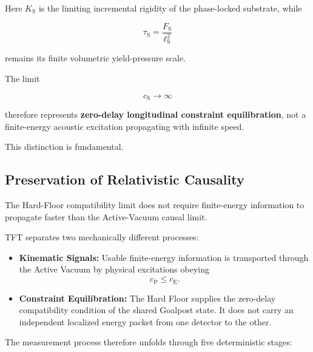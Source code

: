 Here $K_{\mathrm S}$ is the limiting incremental rigidity of the phase-locked substrate, while

\begin{equation}
    \tau_{\mathrm S}
    =
    \frac{F_{\mathrm S}}{\ell_{\mathrm S}^2}
\end{equation}

remains its finite volumetric yield-pressure scale.

The limit

\begin{equation}
    c_{\mathrm S}\longrightarrow\infty
\end{equation}

therefore represents \textbf{zero-delay longitudinal constraint equilibration}, not a finite-energy acoustic excitation propagating with infinite speed.

This distinction is fundamental.

\subsection{Preservation of Relativistic Causality}
\label{sec:causality_preservation}

The Hard-Floor compatibility limit does not require finite-energy information to propagate faster than the Active-Vacuum causal limit.

TFT separates two mechanically different processes:

\begin{itemize}

    \item \textbf{Kinematic Signals:}
    Usable finite-energy information is transported through the Active Vacuum by physical excitations obeying
    \begin{equation}
        c_{\mathrm P}\leq c_{\mathrm E}.
    \end{equation}

    \item \textbf{Constraint Equilibration:}
    The Hard Floor supplies the zero-delay compatibility condition of the shared Goalpost state. It does not carry an independent localized energy packet from one detector to the other.

\end{itemize}

The measurement process therefore unfolds through five deterministic stages:

